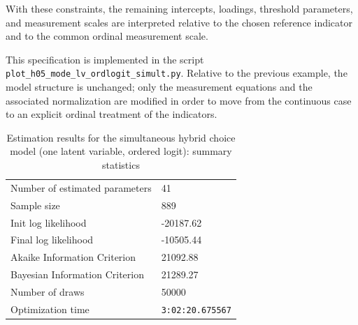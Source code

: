 \documentclass[12pt,a4paper]{article}
\let\OrigUnderscore\_
\def\_{\OrigUnderscore\penalty0\hspace{0pt}}%
\begin{document}
With these constraints, the remaining intercepts, loadings, threshold
parameters, and measurement scales are interpreted relative to the
chosen reference indicator and to the common ordinal measurement
scale.

This specification is implemented in the script
\texttt{plot\_h05\_mode\_lv\_ordlogit\_simult.py}. Relative to the
previous example, the model structure is unchanged; only the
measurement equations and the associated normalization are modified in
order to move from the continuous case to an explicit ordinal
treatment of the indicators.

\begin{table}
  \small \ttfamily \centering
  \begin{tabular}{ll}
Number of estimated parameters & 41 \\
Sample size & 889 \\
Init log likelihood & -20187.62 \\
Final log likelihood & -10505.44 \\
Akaike Information Criterion & 21092.88 \\
Bayesian Information Criterion & 21289.27 \\
Number of draws & 50000 \\
Optimization time & \verb$3:02:20.675567$ \\
\end{tabular}
\caption{Estimation results for the simultaneous hybrid choice model
  (one latent variable, ordered logit): summary statistics}
\label{tab:example5_results_summary}
\end{table}
\end{document}
